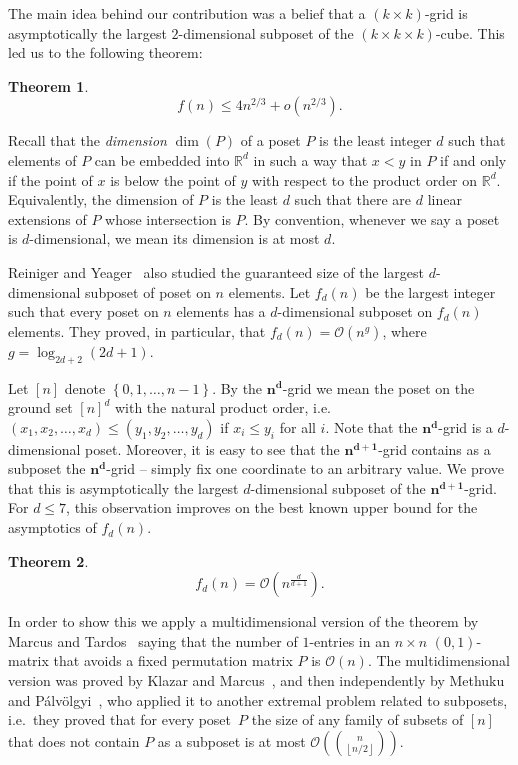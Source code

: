 \documentclass[a4paper,reqno,12pt]{amsart}
\newtheorem{theorem}{Theorem}
\theoremstyle{remark}
\theoremstyle{plain}
\theoremstyle{definition}
\newcommand{\set}[1]{\left\{#1\right\}}
\newcommand{\floor}[1]{{\left\lfloor #1 \right\rfloor}}
\newcommand{\setR}{\mathbb{R}}
\renewcommand{\O}{\mathcal{O}}
\let\leq\leqslant
\begin{document}
The main idea behind our contribution was a belief that a $(k \times k)$-grid
is asymptotically the largest $2$-dimensional subposet of the
$(k \times k \times k)$-cube. This led us to the following theorem:
\begin{theorem}\label{thm:main}
\[
f(n) \leq 4n^{2/3} + o\left(n^{2/3}\right).
\]
\end{theorem}

Recall that the \emph{dimension} $\dim(P)$ of a poset $P$
is the least integer $d$ such that elements of $P$ can be embedded into $\setR^d$ in such a way that $x< y$ in $P$ if and only if
the point of $x$ is below the point of $y$ with respect to the product order on $\setR^d$.
Equivalently, the dimension of $P$ is the least $d$ such that there are $d$ linear extensions of $P$ whose intersection is $P$.
By convention, whenever we say a poset is $d$-dimensional, we mean its dimension
is at most $d$.

Reiniger and Yeager~\cite{Reiniger2016} also studied the guaranteed size of the
largest $d$-dimensional subposet of poset on $n$ elements.
Let $f_d(n)$ be the largest integer such that every poset on $n$ elements has a $d$-dimensional subposet on $f_d(n)$ elements.
They proved, in particular, that $f_d(n) = \O(n^{g})$, where $g = \log_{2d+2} (2d+1)$.


Let $[n]$ denote $\set{0, 1, \ldots, n - 1}$.
By the $\mathbf{n^d}$-grid we mean the poset on the ground set $[n]^d$ with the natural
product order, i.e.~$(x_1, x_2, \ldots, x_d) \leq (y_1, y_2, \ldots, y_d)$ if $x_i \leq y_i$ for all $i$.
Note that the $\mathbf{n^d}$-grid is a $d$-dimensional poset. Moreover, it is easy to see
that the $\mathbf{n^{d+1}}$-grid contains as a subposet the $\mathbf{n^d}$-grid -- simply fix one
coordinate to an arbitrary value.
We prove that this is asymptotically the largest
$d$-dimensional subposet of the $\mathbf{n^{d+1}}$-grid.
For $d \leq 7$, this observation improves on the best known upper bound for the
asymptotics of $f_d(n)$.

\begin{theorem}\label{thm:general-d}
\[
f_d(n) = \O\left(n^{\frac{d}{d+1}}\right).
\]
\end{theorem}

In order to show this we apply a multidimensional version of the theorem
by Marcus and Tardos~\cite{Marcus2004} saying that the number of $1$-entries in
an $n\times n$ $(0,1)$-matrix that avoids a fixed permutation matrix $P$ is
$\O(n)$.
The multidimensional version was proved by Klazar and Marcus~\cite{Klazar2007},
and then independently by Methuku and Pálvölgyi~\cite{Methuku2017}, who applied
it to another extremal problem related to subposets, i.e.~they proved that for
every poset~$P$ the size of any family of subsets of $[n]$ that does not contain
$P$ as a subposet is at most $\O\left(\binom{n}{\floor{n/2}}\right)$.
\end{document}

